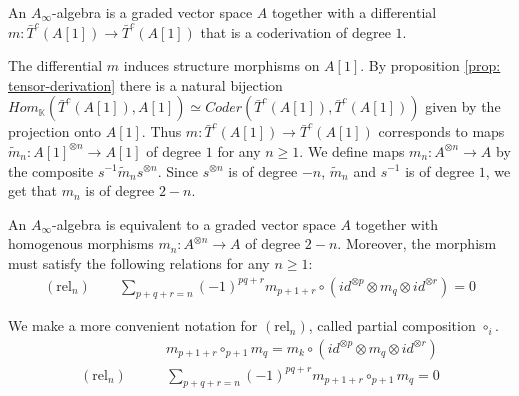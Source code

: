 \documentclass[../thesis.tex]{subfiles}
\begin{document}
        \begin{definition}
            An $A_\infty$-algebra is a graded vector space $A$ together with a differential $m:\bar{T}^c(A[1])\rightarrow\bar{T}^c(A[1])$ that is a coderivation of degree $1$.
        \end{definition}

        The differential $m$ induces structure morphisms on $A[1]$. By proposition \ref{prop: tensor-derivation} there is a natural bijection $Hom_\mathbb{K}(\bar{T}^c(A[1]),A[1])\simeq Coder(\bar{T}^c(A[1]),\bar{T}^c(A[1]))$ given by the projection onto $A[1]$. Thus $m:\bar{T}^c(A[1])\rightarrow\bar{T}^c(A[1])$ corresponds to maps $\widetilde{m}_n:A[1]^{\otimes n}\rightarrow A[1]$ of degree $1$ for any $n\geq 1$. We define maps $m_n : A^{\otimes n}\rightarrow A$ by the composite $s^{-1}\widetilde{m}_ns^{\otimes n}$. Since $s^{\otimes n}$ is of degree $-n$, $\widetilde{m}_n$ and $s^{-1}$ is of degree $1$, we get that $m_n$ is of degree $2-n$.
        \begin{center}
        \end{center}

        \begin{proposition}\label{prop: A-infinity def}
            An $A_\infty$-algebra is equivalent to a graded vector space $A$ together with homogenous morphisms $m_n:A^{\otimes n}\rightarrow A$ of degree $2-n$. Moreover, the morphism must satisfy the following relations for any $n\geq 1$:
            \begin{align*}
                (\text{rel}_n)\qquad \sum_{p+q+r = n}(-1)^{pq+r}m_{p+1+r}\circ (id^{\otimes p}\otimes m_q \otimes id^{\otimes r}) = 0
            \end{align*}
        \end{proposition}

        \begin{remark}
            We make a more convenient notation for $(\text{rel}_n)$, called partial composition $\circ_i$.
            \begin{align*}
                & m_{p+1+r} \circ_{p+1} m_q = m_k \circ (id^{\otimes p}\otimes m_q \otimes id^{\otimes r}) \\
                (\text{rel}_n)\qquad & \sum_{p+q+r = n} (-1)^{pq+r} m_{p+1+r} \circ_{p+1} m_q = 0
            \end{align*}
        \end{remark}
\end{document}
